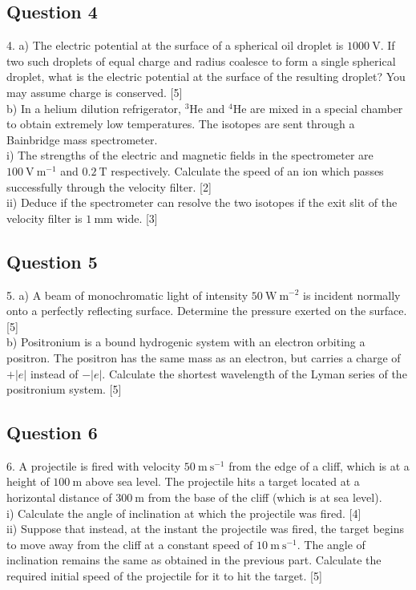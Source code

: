 \documentclass{article}
\begin{document}
\subsection{Question 4}
4. a) The electric potential at the surface of a spherical oil droplet is $1000 \mathrm{~V}$. If two such droplets of equal charge and radius coalesce to form a single spherical droplet, what is the electric potential at the surface of the resulting droplet? You may assume charge is conserved. [5] \\
b) In a helium dilution refrigerator, ${ }^{3} \mathrm{He}$ and ${ }^{4} \mathrm{He}$ are mixed in a special chamber to obtain extremely low temperatures. The isotopes are sent through a Bainbridge mass spectrometer. \\
i) The strengths of the electric and magnetic fields in the spectrometer are $100 \mathrm{~V} \mathrm{~m}^{-1}$ and $0.2 \mathrm{~T}$ respectively. Calculate the speed of an ion which passes successfully through the velocity filter. [2] \\
ii) Deduce if the spectrometer can resolve the two isotopes if the exit slit of the velocity filter is $1 \mathrm{~mm}$ wide. [3]

\subsection{Question 5}
5. a) A beam of monochromatic light of intensity $50 \mathrm{~W} \mathrm{~m}^{-2}$ is incident normally onto a perfectly reflecting surface. Determine the pressure exerted on the surface. [5] \\
b) Positronium is a bound hydrogenic system with an electron orbiting a positron. The positron has the same mass as an electron, but carries a charge of $+|e|$ instead of $-|e| .$ Calculate the shortest wavelength of the Lyman series of the positronium system. [5]

\subsection{Question 6}
6. A projectile is fired with velocity $50 \mathrm{~m} \mathrm{~s}^{-1}$ from the edge of a cliff, which is at a height of $100 \mathrm{~m}$ above sea level. The projectile hits a target located at a horizontal distance of $300 \mathrm{~m}$ from the base of the cliff (which is at sea level). \\
i) Calculate the angle of inclination at which the projectile was fired. [4] \\
ii) Suppose that instead, at the instant the projectile was fired, the target begins to move away from the cliff at a constant speed of $10 \mathrm{~m} \mathrm{~s}^{-1}$. The angle of inclination remains the same as obtained in the previous part. Calculate the required initial speed of the projectile for it to hit the target. [5]
\end{document}
